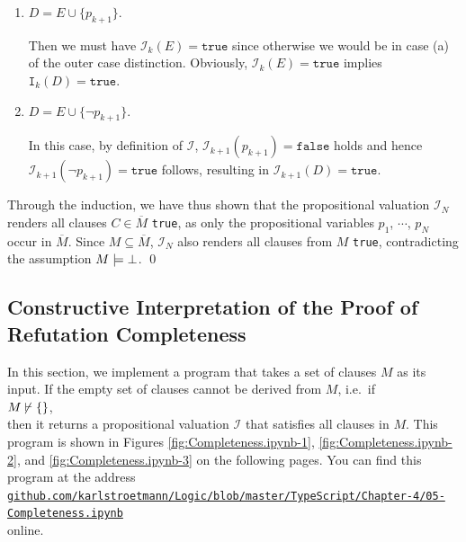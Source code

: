 \begin{enumerate}
\begin{enumerate}
\begin{enumerate}[1.]
          In this case, $\mathcal{I}_{k+1} = \mathtt{true}$ already holds by the induction hypothesis.        
    \item $D = E \cup \{ p_{k+1} \}$.

          Then we must have $\mathcal{I}_k(E) = \mathtt{true}$ since otherwise we would be in case (a) of the
          outer case distinction.  Obviously, $\mathcal{I}_k(E) = \mathtt{true}$ implies $\mathtt{I}_k(D) = \mathtt{true}$.
    \item $D = E \cup \{ \neg p_{k+1} \}$.

          In this case, by definition of $\mathcal{I}$, $\mathcal{I}_{k+1}(p_{k+1}) = \mathtt{false}$
          holds and hence $\mathcal{I}_{k+1}(\neg p_{k+1}) = \mathtt{true}$ follows, resulting in
          $\mathcal{I}_{k+1}(D) = \mathtt{true}$.
    \end{enumerate}
    
    Through the induction, we have thus shown that the propositional valuation
    $\mathcal{I}_{N}$ renders all clauses $C \in \overline{M}$ \texttt{true}, as only the
    propositional variables $p_1$, $\cdots$, $p_N$ occur in $\overline{M}$.
    Since $M \subseteq \overline{M}$, $\mathcal{I}_{N}$ also renders all clauses from $M$ \texttt{true}, 
    contradicting the assumption $M \models \bot$. \qed
  \end{enumerate}
\end{enumerate}

\subsection{Constructive Interpretation of the Proof of Refutation Completeness}
In this section, we implement a program that takes a set of clauses $M$ as its input.
If the empty set of clauses cannot be derived from $M$, i.e.~if
\\[0.2cm]
\hspace*{1.3cm}
$M\, {\not}\!\vdash \{\}$,
\\[0.2cm]
then it returns a propositional valuation $\mathcal{I}$ that satisfies all clauses in $M$.
This program is shown in Figures \ref{fig:Completeness.ipynb-1}, \ref{fig:Completeness.ipynb-2}, and \ref{fig:Completeness.ipynb-3} on the following pages. You can find this program at the address
\\[0.2cm]
\href{https://github.com/karlstroetmann/Logic/blob/master/TypeScript/Chapter-4/05-Completeness.ipynb}{\small\texttt{github.com/karlstroetmann/Logic/blob/master/TypeScript/Chapter-4/05-Completeness.ipynb}}
\\[0.2cm]
online.

